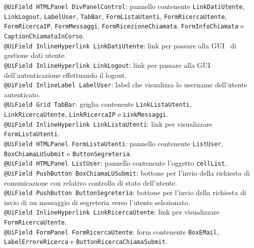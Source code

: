 {\begin{sloppypar}
{{\begin{itemize}
					\texttt{@UiField HTMLPanel DivPanelControl}: pannello contenente \texttt{LinkDatiUtente}, 
					\texttt{LinkLogout}, \texttt{LabelUser}, \texttt{TabBar}, \texttt{FormListaUtenti}, 
					\texttt{FormRicercaUtente}, \texttt{FormRicercaIP}, \texttt{FormMessaggi}, \texttt{FormRicezioneChiamata}, 
					\texttt{FormInfoChiamata} e \texttt{CaptionChiamataInCorso}.\\
					
					\texttt{@UiField InlineHyperlink LinkDatiUtente}: link per passare alla GUI\g~ di 
						gestione dati utente.\\

					\texttt{@UiField InlineHyperlink LinkLogout}: link per passare alla GUI\g~ 
						dell'autenticazione effettuando il logout.\\

					\texttt{@UiField InlineLabel LabelUser}: label che visualizza lo username dell'utente 
						autenticato.\\

					\texttt{@UiField Grid TabBar}: griglia contenente \texttt{LinkListaUtenti}, 
						\texttt{LinkRicercaUtente}, \texttt{LinkRicercaIP} e \texttt{LinkMessaggi}.\\

					\texttt{@UiField InlineHyperlink LinkListaUtenti}: link per visualizzare 
						\texttt{FormListaUtenti}.\\

					\texttt{@UiField HTMLPanel FormListaUtenti}: pannello contenente \texttt{ListUser}, 
						\texttt{BoxChiamaLUSubmit} e \texttt{ButtonSegreteria}.\\

					\texttt{@UiField HTMLPanel ListUser}: pannello contenente l'oggetto \texttt{cellList}.\\

					\texttt{@UiField PushButton BoxChiamaLUSubmit}: bottone per l'invio della richiesta di 
						comunicazione con relativo controllo di stato dell'utente.\\
					
					\texttt{@UiField PushButton ButtonSegreteria}: bottone per l'invio della richiesta di 
						invio di un messaggio di segreteria verso l'utente selezionato.\\

					\texttt{@UiField InlineHyperlink LinkRicercaUtente}: link per visualizzare
						\texttt{FormRicercaUtente}.\\

					\texttt{@UiField FormPanel FormRicercaUtente}: form contenente \texttt{BoxEMail}, 
						\texttt{LabelErroreRicerca} e \texttt{ButtonRicercaChiamaSubmit}.\\


\end{itemize}}}
\end{sloppypar}}
